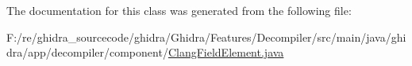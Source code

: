 The documentation for this class was generated from the following file\+:\begin{DoxyCompactItemize}
\item 
F\+:/re/ghidra\+\_\+sourcecode/ghidra/\+Ghidra/\+Features/\+Decompiler/src/main/java/ghidra/app/decompiler/component/\mbox{\hyperlink{_clang_field_element_8java}{Clang\+Field\+Element.\+java}}\end{DoxyCompactItemize}
